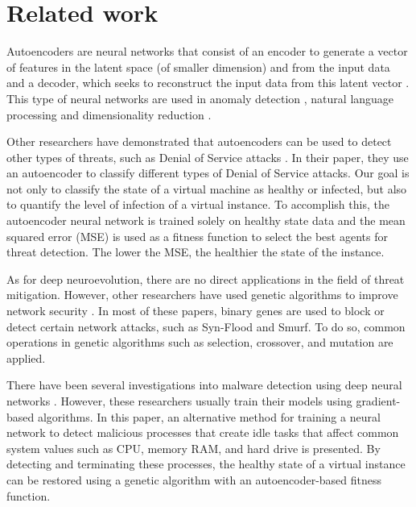 \documentclass{iosart2c}
\begin{document}
\section{Related work}\label{relatedwork}

Autoencoders are neural networks that consist of an encoder to generate a vector of features in the latent space (of smaller dimension) and from the input data and a decoder, which seeks to reconstruct the input data from this latent vector \cite{autoencoders_nlp1}. This type of neural networks are used in anomaly detection \cite{anomaly1, anomaly3, anomaly4}, natural language processing \cite{autoencoders_nlp1} and dimensionality reduction \cite{dimred1, dimred2}.

Other researchers have demonstrated that autoencoders can be used to detect other types of threats, such as Denial of Service attacks \cite{autoencoderdos}. In their paper, they use an autoencoder to classify different types of Denial of Service attacks. Our goal is not only to classify the state of a virtual machine as healthy or infected, but also to quantify the level of infection of a virtual instance. To accomplish this, the autoencoder neural network is trained solely on healthy state data and the mean squared error (MSE) is used as a fitness function to select the best agents for threat detection. The lower the MSE, the healthier the state of the instance.

As for deep neuroevolution, there are no direct applications in the field of threat mitigation. However, other researchers have used genetic algorithms to improve network security \cite{GA1, GA2, GA3}. In most of these papers, binary genes are used to block or detect certain network attacks, such as Syn-Flood and Smurf. To do so, common operations in genetic algorithms such as selection, crossover, and mutation are applied.

There have been several investigations into malware detection using deep neural networks \cite{malwarednn1, malwarednn2,malwarednn3}. However, these researchers usually train their models using gradient-based algorithms. In this paper, an alternative method for training a neural network to detect malicious processes that create idle tasks that affect common system values such as CPU, memory RAM, and hard drive is presented. By detecting and terminating these processes, the healthy state of a virtual instance can be restored using a genetic algorithm with an autoencoder-based fitness function.
\end{document}
